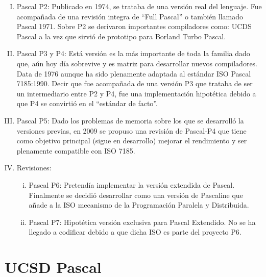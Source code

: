 \begin{enumerate}[I.]

\item {}Pascal P2: Publicado en 1974, se trataba de una versión real del 
lenguaje. Fue acompañada de una revisión integra de ``Full Pascal'' o también llamado Pascal 
1971. Sobre P2 se derivaron importantes compiladores como: UCDS Pascal a la vez 
que sirvió de prototipo para Borland Turbo Pascal.

\item {}Pascal P3 y P4: Está versión es la más importante de toda la 
familia dado que, aún hoy día sobrevive y es matriz para desarrollar nuevos 
compiladores. Data de 1976 aunque ha sido plenamente adaptada al estándar ISO Pascal 7185:1990. Decir que fue acompañada de una versión P3 que trataba de 
ser un intermediario entre P2 y P4, fue una implementación hipotética debido a 
que P4 se convirtió en el ``estándar de facto''.

\item {}Pascal P5: Dado los problemas de memoria sobre los que se 
desarrolló la versiones previas, en 2009 se propuso una revisión de Pascal-P4 
que tiene como objetivo principal (sigue en desarrollo) mejorar el rendimiento y 
ser plenamente compatible con ISO 7185.

\item Revisiones:
{

\begin{enumerate}[i.]

\item {}Pascal P6: Pretendía implementar la versión extendida de Pascal. 
Finalmente se decidió desarrollar como una versión de Pascaline que añade a la 
ISO mecanismo de la Programación Paralela y Distribuida.

\item {}Pascal P7: Hipotética versión exclusiva para Pascal Extendido. No se ha 
llegado a codificar debido a que dicha ISO es parte del proyecto P6.

\end{enumerate}

}
\end{enumerate}



\section{UCSD Pascal}

